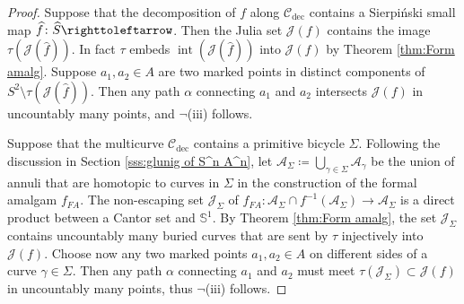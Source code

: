 \documentclass{amsart}
\theoremstyle{plain}
\theoremstyle{definition}
\theoremstyle{remark}
\renewcommand{\AA}{{\mathcal A}}
\newcommand{\reminder}[1]{\textsl{$\lhd\rhd$#1$\lhd\rhd$}\marginpar{$\lhd\rhd\lhd\rhd\lhd\rhd$}}%
\newcommand{\hide}[1]{}
\newcommand{\Fat}{{\mathcal F}}
\newcommand{\Jul}{{\mathcal J}}
\newcommand{\CC}{{\mathcal C}}
\newcommand{\intr}{{\operatorname{int}}}
\newcommand\selfmap{\righttoleftarrow}
\newcommand{\cro}{{\operatorname{dec}}}
\begin{document}
\begin{proof}



Suppose that the decomposition of $f$ along $\CC_\cro$ contains a Sierpi\'{n}ski small map $\widehat f\colon \widehat S \selfmap$.  
Then the Julia set $\Jul(f)$ contains the image $\tau(\Jul(\widehat f))$. In fact $\tau$ embeds $\intr(\Jul(\widehat f))$ into $\Jul(f)$ by Theorem \ref{thm:Form amalg}. Suppose $a_1,a_2\in A$ are two marked points in distinct components of $S^2\setminus  \tau(\Jul(\widehat f))$. Then any path $\alpha$ connecting $a_1$ and $a_2$ intersects $\Jul(f)$ in uncountably many points,  and $\neg$(iii) follows.



Suppose that the multicurve $\CC_\cro$ contains a primitive bicycle $\Sigma$.  Following the discussion in Section \ref{sss:glunig of S^n A^n}, let $\AA_\Sigma\coloneq  \bigcup_{\gamma\in \Sigma} \AA_\gamma$ be the union of annuli that are homotopic to curves in $\Sigma$ in the construction of the formal amalgam $f_{FA}$. The non-escaping set $\Jul_\Sigma$ of $f_{FA}\colon \AA_\Sigma\cap f^{-1}(\AA_\Sigma)\to \AA_\Sigma$ is a direct product between a Cantor set and $\mathbb{S}^1$. By Theorem \ref{thm:Form amalg}, the set $\Jul_\Sigma$ contains uncountably many buried curves that are sent by $\tau$ injectively into $\Jul(f)$. Choose now any two marked points $a_1,a_2\in A$ on different sides of a curve $\gamma\in\Sigma$. Then any path $\alpha$ connecting $a_1$ and $a_2$ must meet $\tau(\Jul_\Sigma) \subset \Jul(f)$ in uncountably many points,  thus $\neg$(iii) follows.


\end{proof}
\end{document}
